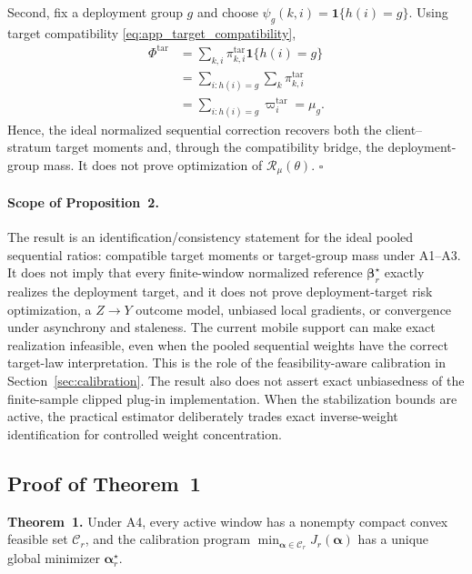 Second, fix a deployment group $g$ and choose
$\psi_g(k,i)=\mathbf{1}\{h(i)=g\}$.
Using target compatibility
\eqref{eq:app_target_compatibility},
\begin{align}
 \Phi^{\mathrm{tar}}
 &=
 \sum_{k,i}
 \pi^{\mathrm{tar}}_{k,i}
 \mathbf{1}\{h(i)=g\}
 \nonumber\\
 &=
 \sum_{i:h(i)=g}
 \sum_k
 \pi^{\mathrm{tar}}_{k,i}
 \nonumber\\
 &=
 \sum_{i:h(i)=g}
 \varpi_i^{\mathrm{tar}}
 =
 \mu_g.
 \label{eq:app_recover_group}
\end{align}
Hence, the ideal normalized sequential correction recovers both the
client--stratum target moments and, through the compatibility bridge, the
deployment-group mass.  It does not prove optimization of
$\mathcal{R}_{\mu}(\theta)$. \hfill$\square$

\paragraph{Scope of Proposition~2.}
The result is an identification/consistency statement for the ideal pooled
sequential ratios: compatible target moments or target-group mass under
A1--A3.  It does not imply that every finite-window normalized
reference $\boldsymbol\beta_r^\star$ exactly realizes the deployment target,
and it does not prove deployment-target risk optimization, a $Z\!\to\!Y$
outcome model, unbiased local gradients, or convergence under asynchrony
and staleness.
The current mobile support can make exact realization infeasible, even when
the pooled sequential weights have the correct target-law interpretation.  This
is the role of the feasibility-aware calibration in
Section~\ref{sec:calibration}.  The result also does not assert exact
unbiasedness of the finite-sample clipped plug-in implementation.  When the
stabilization bounds are active, the practical estimator deliberately trades
exact inverse-weight identification for controlled weight concentration.


\subsection{Proof of Theorem~1}
\label{app:proof_theorem1}

\noindent\textbf{Theorem~1.}
Under A4, every active window has a nonempty compact convex feasible set
$\mathcal{C}_r$, and the calibration program
$\min_{\boldsymbol\alpha\in\mathcal{C}_r}J_r(\boldsymbol\alpha)$
has a unique global minimizer $\boldsymbol\alpha_r^\star$.

